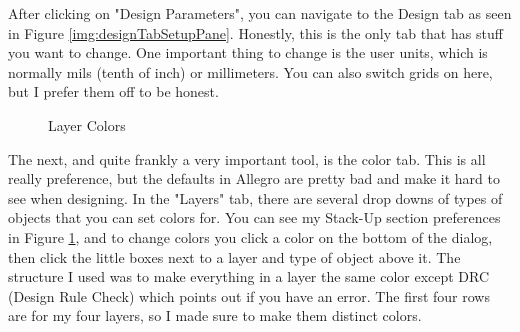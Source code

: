 After clicking on "Design Parameters", you can navigate to the Design tab as seen in Figure \ref{img:designTabSetupPane}. Honestly,
this is the only tab that has stuff you want to change. One important thing to change is the user units, which is normally mils (tenth of inch)
or millimeters. You can also switch grids on here, but I prefer them off to be honest.

\begin{figure}[H]
  \centering
\caption{Layer Colors}
\label{img:colorsTabSetupPane}
\end{figure}

The next, and quite frankly a very important tool, is the color tab. This is all really preference, but the defaults in Allegro are pretty bad
and make it hard to see when designing. In the "Layers" tab, there are several drop downs of types of objects that you can set colors for.
You can see my Stack-Up section preferences in Figure \ref{img:colorsTabSetupPane}, and to change colors you click a color on the bottom of the dialog,
then click the little boxes next to a layer and type of object above it. The structure I used was to make everything in a layer the same color except DRC (Design Rule Check)
which points out if you have an error. The first four rows are for my four layers, so I made sure to make them distinct colors. 

